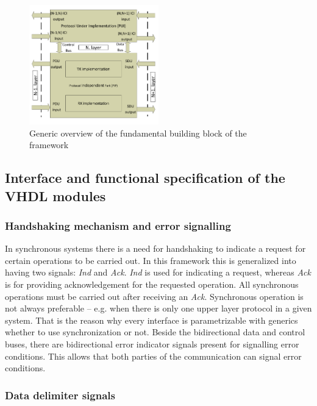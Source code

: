 \documentclass[conference]{IEEEtran}
\begin{document}
\begin{figure}[!htb]
    \centering
    \includegraphics[width=0.5\textwidth]{figures_raw/system_sketch.pdf}
    \caption{Generic overview of the fundamental building block of the framework}
    \label{fig:system_sketch}
\end{figure}

\subsection{Interface and functional specification of the VHDL modules}\label{subsec:if_and_func_spec_VHDL}

\subsubsection{Handshaking mechanism and error signalling}
In synchronous systems there is a need for handshaking to indicate a request for certain operations to be carried out.
In this framework this is generalized into having two signals: \emph{Ind} and \emph{Ack}.
\emph{Ind} is used for indicating a request, whereas \emph{Ack} is for providing acknowledgement for
the requested operation. All synchronous operations must be carried out after receiving an \emph{Ack}.
Synchronous operation is not always preferable -- e.g. when there is only one upper layer protocol in a
given system. That is the reason why every interface is parametrizable with generics whether to use
synchronization or not.
Beside the bidirectional data and control buses, there are bidirectional error indicator signals present
for signalling error conditions. This allows that both parties of the communication can signal error conditions.

\subsubsection{Data delimiter signals}
\end{document}
